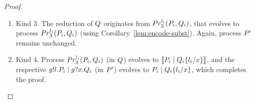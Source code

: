 \begin{proof}
\begin{enumerate}
%
\item Kind $3$. The reduction of $Q$ originates from $Pr_2^{l_i}(P_i, Q_i)$, that evolves to process $Pr_3^{l_i}(P_i, Q_i)$ (using Corollary~\ref{lem:encode-subst}). Again, process $P'$ remains unchanged.
%
\item Kind $4$. Process $Pr_3^{l_i}(P_i, Q_i)$ (in $Q$) evolves to $\llbracket P_i \;|\; Q_i\{l_i/x\} \rrbracket$, and the respective $g!l.P_i\;|\; g?x.Q_i$ (in $P'$) evolves to $P_i\;|\; Q_i\{l_i/x\}$, which completes the proof.
\end{enumerate}
\end{proof}

%
